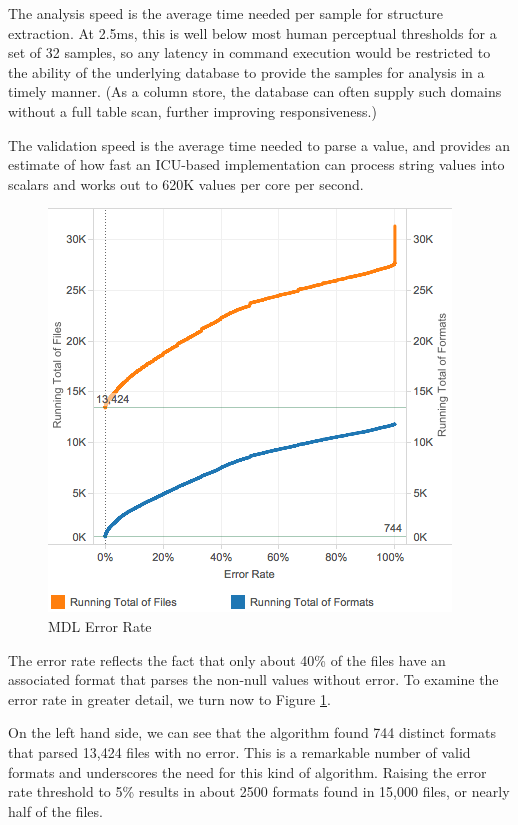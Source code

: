 The analysis speed is the average time needed per sample for structure extraction. At 2.5ms, this is well below most human perceptual thresholds for a set of 32 samples, so any latency in command execution would be restricted to the ability of the underlying database to provide the samples for analysis in a timely manner. (As a column store, the database can often supply such domains without a full table scan, further improving responsiveness.) 

The validation speed is the average time needed to parse a value, and provides an estimate of how fast an ICU-based implementation can process string values into scalars and works out to 620K values per core per second.\\
 
\begin{figure}[ht]
\centering
\includegraphics[width=\columnwidth]{figures/FigureM2}
\caption{MDL Error Rate}
\label{fig:M2}
\end{figure}


The error rate reflects the fact that only about 40\% of the files have an associated format that parses the non-null values without error. To examine the error rate in greater detail, we turn now to Figure \ref{fig:M2}.

On the left hand side, we can see that the algorithm found 744 distinct formats that parsed 13,424 files with no error. This is a remarkable number of valid formats and underscores the need for this kind of algorithm. Raising the error rate threshold to 5\% results in about 2500 formats found in 15,000 files, or nearly half of the files. 

